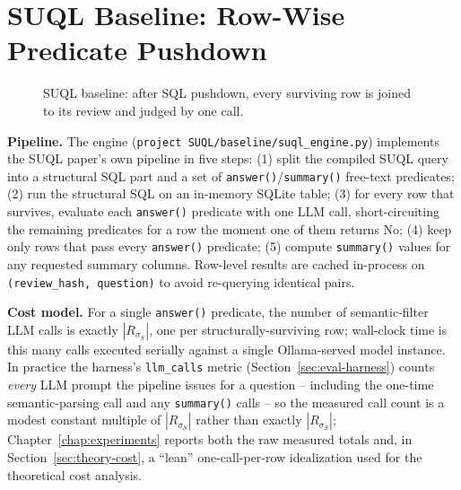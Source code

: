 \section{SUQL Baseline: Row-Wise Predicate Pushdown}
\label{sec:suql-baseline}

\begin{figure}[h]
\centering
{}
\caption{SUQL baseline: after SQL pushdown, every surviving row is joined
to its review and judged by one \answerfn{} call.}
\label{fig:suql-baseline}
\end{figure}

\textbf{Pipeline.} The engine (\texttt{project SUQL/baseline/suql\_engine.py})
implements the SUQL paper's own pipeline in five steps: (1) split the
compiled SUQL query into a structural SQL part and a set of
\texttt{answer()}/\texttt{summary()} free-text predicates; (2) run the
structural SQL on an in-memory SQLite table; (3) for every row that
survives, evaluate each \texttt{answer()} predicate with one LLM call,
short-circuiting the remaining predicates for a row the moment one of
them returns No; (4) keep only rows that pass every \texttt{answer()}
predicate; (5) compute \texttt{summary()} values for any requested
summary columns. Row-level results are cached in-process on
\texttt{(review\_hash, question)} to avoid re-querying identical pairs.

\textbf{Cost model.} For a single \texttt{answer()} predicate, the
number of semantic-filter LLM calls is exactly $|R_{\sigma_S}|$, one per
structurally-surviving row; wall-clock time is this many calls executed
serially against a single Ollama-served model instance. In practice the
harness's \texttt{llm\_calls} metric (Section~\ref{sec:eval-harness})
counts \emph{every} LLM prompt the pipeline issues for a question --
including the one-time semantic-parsing call and any \texttt{summary()}
calls -- so the measured call count is a modest constant multiple of
$|R_{\sigma_S}|$ rather than exactly $|R_{\sigma_S}|$; Chapter~\ref{chap:experiments}
reports both the raw measured totals and, in
Section~\ref{sec:theory-cost}, a ``lean'' one-call-per-row idealization
used for the theoretical cost analysis.

